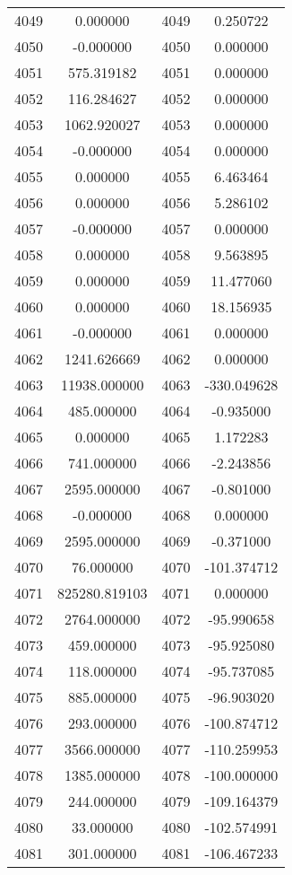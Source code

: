 \documentclass[12pt]{article}
\begin{document}
\begin{longtable}{@{}cccc@{}}
4049 & 0.000000 & 4049 & 0.250722 \\
4050 & -0.000000 & 4050 & 0.000000 \\
4051 & 575.319182 & 4051 & 0.000000 \\
4052 & 116.284627 & 4052 & 0.000000 \\
4053 & 1062.920027 & 4053 & 0.000000 \\
4054 & -0.000000 & 4054 & 0.000000 \\
4055 & 0.000000 & 4055 & 6.463464 \\
4056 & 0.000000 & 4056 & 5.286102 \\
4057 & -0.000000 & 4057 & 0.000000 \\
4058 & 0.000000 & 4058 & 9.563895 \\
4059 & 0.000000 & 4059 & 11.477060 \\
4060 & 0.000000 & 4060 & 18.156935 \\
4061 & -0.000000 & 4061 & 0.000000 \\
4062 & 1241.626669 & 4062 & 0.000000 \\
4063 & 11938.000000 & 4063 & -330.049628 \\
4064 & 485.000000 & 4064 & -0.935000 \\
4065 & 0.000000 & 4065 & 1.172283 \\
4066 & 741.000000 & 4066 & -2.243856 \\
4067 & 2595.000000 & 4067 & -0.801000 \\
4068 & -0.000000 & 4068 & 0.000000 \\
4069 & 2595.000000 & 4069 & -0.371000 \\
4070 & 76.000000 & 4070 & -101.374712 \\
4071 & 825280.819103 & 4071 & 0.000000 \\
4072 & 2764.000000 & 4072 & -95.990658 \\
4073 & 459.000000 & 4073 & -95.925080 \\
4074 & 118.000000 & 4074 & -95.737085 \\
4075 & 885.000000 & 4075 & -96.903020 \\
4076 & 293.000000 & 4076 & -100.874712 \\
4077 & 3566.000000 & 4077 & -110.259953 \\
4078 & 1385.000000 & 4078 & -100.000000 \\
4079 & 244.000000 & 4079 & -109.164379 \\
4080 & 33.000000 & 4080 & -102.574991 \\
4081 & 301.000000 & 4081 & -106.467233 \\

\end{longtable}
\end{document}

